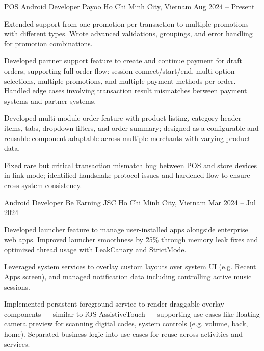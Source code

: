 \begin{cventries}

    \cventry
    {POS Android Developer}
    {Payoo}
    {Ho Chi Minh City, Vietnam}
    {Aug 2024 -- Present}
    {
        \begin{cvitems}
            \item {
                Extended support from one promotion per transaction to multiple promotions with different types.
                Wrote advanced validations, groupings, and error handling for promotion combinations.
            }
            \item {
                Developed partner support feature to create and continue payment for draft orders, supporting full order flow: session connect/start/end,
                multi-option selections, multiple promotions, and multiple payment methods per order. Handled edge cases involving transaction result
                mismatches between payment systems and partner systems.
            }
            \item {
                Developed multi-module order feature with product listing, category header items, tabs, dropdown filters, and order summary;
                designed as a configurable and reusable component adaptable across multiple merchants with varying product data.
            }
            \item {
                Fixed rare but critical transaction mismatch bug between POS and store devices in link mode;
                identified handshake protocol issues and hardened flow to ensure cross-system consistency.
            }
        \end{cvitems}
    }

    \cventry
    {Android Developer}
    {Be Earning JSC}
    {Ho Chi Minh City, Vietnam}
    {Mar 2024 -- Jul 2024}
    {
        \begin{cvitems}
            \item {
                Developed launcher feature to manage user-installed apps alongside enterprise web apps.
                Improved launcher smoothness by \~25\% through memory leak fixes and optimized thread usage with LeakCanary and StrictMode.
            }
            \item {
                Leveraged system services to overlay custom layouts over system UI (e.g. Recent Apps screen),
                and managed notification data including controlling active music sessions.
            }
            \item {
                Implemented persistent foreground service to render draggable overlay components — similar to iOS AssistiveTouch —
                supporting use cases like floating camera preview for scanning digital codes, system controls (e.g. volume, back, home).
                Separated business logic into use cases for reuse across activities and services.
            }
        \end{cvitems}
    }


\end{cventries}
